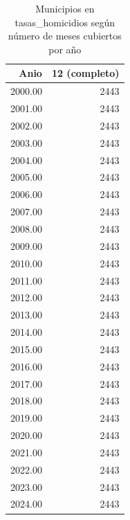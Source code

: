 \begin{table}[ht]
\centering
\caption{Municipios en tasas\_homicidios según número de meses cubiertos por año} 
\label{tab:muni_M7_meses_por_muni_anio}
\begin{tabular}{rr}
  \toprule
Anio & 12 (completo) \\ 
  \midrule
2000.00 & 2443 \\ 
  2001.00 & 2443 \\ 
  2002.00 & 2443 \\ 
  2003.00 & 2443 \\ 
  2004.00 & 2443 \\ 
  2005.00 & 2443 \\ 
  2006.00 & 2443 \\ 
  2007.00 & 2443 \\ 
  2008.00 & 2443 \\ 
  2009.00 & 2443 \\ 
  2010.00 & 2443 \\ 
  2011.00 & 2443 \\ 
  2012.00 & 2443 \\ 
  2013.00 & 2443 \\ 
  2014.00 & 2443 \\ 
  2015.00 & 2443 \\ 
  2016.00 & 2443 \\ 
  2017.00 & 2443 \\ 
  2018.00 & 2443 \\ 
  2019.00 & 2443 \\ 
  2020.00 & 2443 \\ 
  2021.00 & 2443 \\ 
  2022.00 & 2443 \\ 
  2023.00 & 2443 \\ 
  2024.00 & 2443 \\ 
   \bottomrule
\end{tabular}
\end{table}
